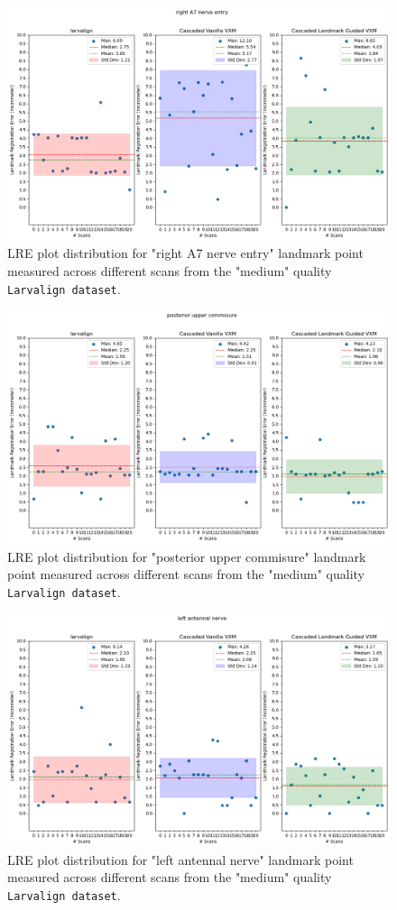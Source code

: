 	\begin{figure}[h!]
		\centering
		\includegraphics[width=0.75\columnwidth]{resources/chapter5_fresh/output/right A7 nerve entry.png}
		\caption{LRE plot distribution for "right A7 nerve entry" landmark point measured across different scans from the "medium" quality \texttt{Larvalign dataset}.}
		\label{fig:landmark27}
	\end{figure}

	\begin{figure}[h!]
		\centering
		\includegraphics[width=0.75\columnwidth]{resources/chapter5_fresh/output/posterior upper commisure.png}
		\caption{LRE plot distribution for "posterior upper commisure" landmark point measured across different scans from the "medium" quality \texttt{Larvalign dataset}.}
		\label{fig:landmark28}
	\end{figure}

	\begin{figure}[h!]
		\centering
		\includegraphics[width=0.75\columnwidth]{resources/chapter5_fresh/output/left antennal nerve.png}
		\caption{LRE plot distribution for "left antennal nerve" landmark point measured across different scans from the "medium" quality \texttt{Larvalign dataset}.}
		\label{fig:landmark29}
	\end{figure}

